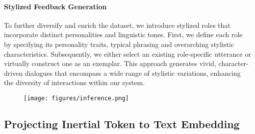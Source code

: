 \vspace{-4mm}
\paragraph{Stylized Feedback Generation} 

To further diversify and enrich the dataset, we introduce stylized roles that incorporate distinct personalities and linguistic tones. First, we define each role by specifying its personality traits, typical phrasing and overarching stylistic characteristics. Subsequently, we either select an existing role-specific utterance or virtually construct one as an exemplar. This approach generates vivid, character-driven dialogues that encompass a wide range of stylistic variations, enhancing the diversity of interactions within our system.

\begin{figure}[t!]
  \centering
  \texttt{[image: figures/inference.png]}
  \vspace{-20px}
\label{fig:inference_pipeline}
\vspace{-10px}
\end{figure}


\subsection{Projecting Inertial Token to Text Embedding}
\label{sec:pretrain}

